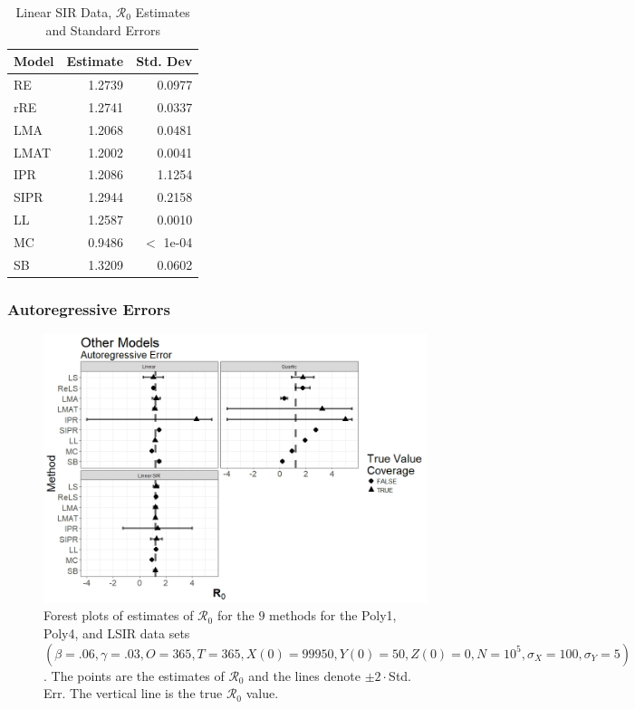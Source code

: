 \documentclass[12pt]{article}
\newcommand{\xxsir}{\ensuremath{9} } %
\newcommand{\rr}{\ensuremath{\mathcal{R}_0}}
\begin{document}
\begin{table}[H]
	
	\centering
	\begin{tabular}[t]{l|r|r}
		\hline
		Model & Estimate & Std. Dev\\
		\hline
		RE & 1.2739 & 0.0977\\
		\hline
		rRE & 1.2741 & 0.0337\\
		\hline
		LMA & 1.2068 & 0.0481\\
		\hline
		LMAT & 1.2002 & 0.0041\\
		\hline
		IPR & 1.2086 & 1.1254\\
		\hline
		SIPR & 1.2944 & 0.2158\\
		\hline
		LL & 1.2587 & 0.0010\\
		\hline
		MC & 0.9486 & $<$ 1e-04\\
		\hline
		SB & 1.3209 & 0.0602\\
		\hline
	\end{tabular}
	\caption{Linear SIR Data, $\rr$ Estimates and Standard Errors}
\end{table}



\subsubsection{Autoregressive Errors}

\begin{figure}[H]
	\begin{center}
		\includegraphics[scale=0.5]{images/other_ar.jpeg}
		\caption{Forest plots of estimates of $\rr$ for the \xxsir methods for the Poly1, Poly4, and LSIR data sets $(\beta=.06, \gamma=.03, O=365, T=365, X(0)=99950, Y(0)=50, Z(0)=0, N=10^5, \sigma_X=100, \sigma_Y=5)$.  The points are the estimates of $\rr$ and the lines denote $\pm 2\cdot $Std. Err.  The vertical line is the true $\rr$ value.}
	\end{center}
\end{figure}
\end{document}
